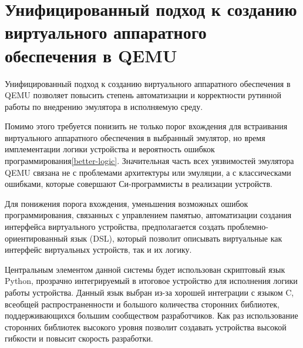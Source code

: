 \section{Унифицированный подход к созданию виртуального аппаратного обеспечения в QEMU}\label{sec:ch1/sec4}

Унифицированный подход к созданию виртуального аппаратного обеспечения в QEMU позволяет
повысить степень автоматизации и корректности рутинной работы по внедрению
эмулятора в исполняемую среду.

Помимо этого требуется понизить не только порог вхождения для встраивания виртуального аппаратного обеспечения
в выбранный эмулятор, но время имплементации логики устройства и вероятность ошибкок программирования\cref{better-logic}.
Значительная часть всех уязвимостей эмулятора QEMU связана не с проблемами архитектуры или эмуляции,
а с классическами ошибками, которые совершают Си-программисты в реализации устройств.


Для понижения порога вхождения, уменьшения возможных ошибок программирования,
связанных с управлением памятью, автоматизации создания интерфейса виртуального
устройства, предполагается создать проблемно-ориентированный язык (DSL), который позволит
описывать виртуальные как интерфейс виртуальных устройств, так и их логику.

Центральным элементом данной системы будет использован скриптовый язык Python, прозрачно интегрируемый
в итоговое устройство для исполнения логики работы устройства.
Данный язык выбран из-за хорошей интеграции с языком C, всеобщей распространенности и большого
количества сторонних библиотек, поддерживающихся большим сообществом разработчиков.
Как раз использование сторонних библиотек высокого уровня позволит создавать устройства
высокой гибкости и повысит скорость разработки.


